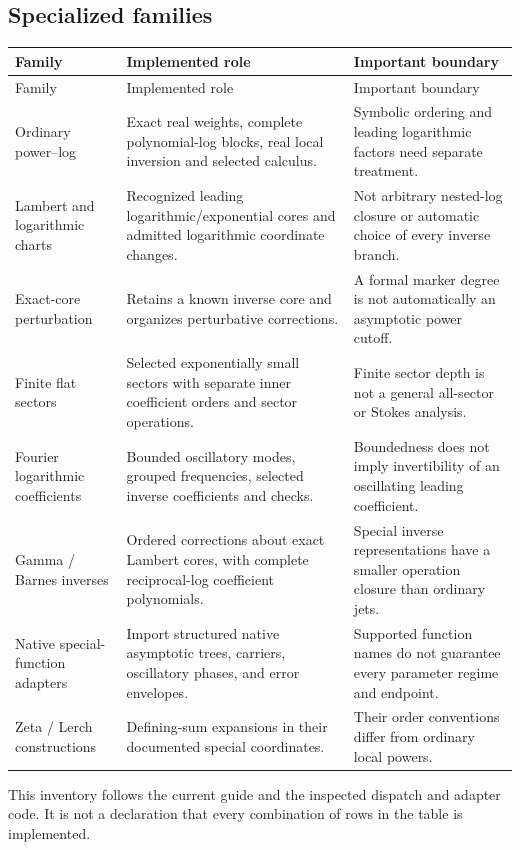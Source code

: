 \documentclass[11pt,a4paper]{article}
\theoremstyle{remark}\newtheorem{remark}[proposition]{Remark}
\begin{document}
\subsection{Specialized families}
\begin{longtable}{P{0.23\textwidth}P{0.42\textwidth}P{0.25\textwidth}}
\toprule Family & Implemented role & Important boundary \\\midrule
\endfirsthead
\toprule Family & Implemented role & Important boundary \\\midrule
\endhead
Ordinary power--log & Exact real weights, complete polynomial-log blocks, real local inversion and selected calculus. & Symbolic ordering and leading logarithmic factors need separate treatment. \\
Lambert and logarithmic charts & Recognized leading logarithmic/exponential cores and admitted logarithmic coordinate changes. & Not arbitrary nested-log closure or automatic choice of every inverse branch. \\
Exact-core perturbation & Retains a known inverse core and organizes perturbative corrections. & A formal marker degree is not automatically an asymptotic power cutoff. \\
Finite flat sectors & Selected exponentially small sectors with separate inner coefficient orders and sector operations. & Finite sector depth is not a general all-sector or Stokes analysis. \\
Fourier logarithmic coefficients & Bounded oscillatory modes, grouped frequencies, selected inverse coefficients and checks. & Boundedness does not imply invertibility of an oscillating leading coefficient. \\
Gamma / Barnes inverses & Ordered corrections about exact Lambert cores, with complete reciprocal-log coefficient polynomials. & Special inverse representations have a smaller operation closure than ordinary jets. \\
Native special-function adapters & Import structured native asymptotic trees, carriers, oscillatory phases, and error envelopes. & Supported function names do not guarantee every parameter regime and endpoint. \\
Zeta / Lerch constructions & Defining-sum expansions in their documented special coordinates. & Their order conventions differ from ordinary local powers. \\
\bottomrule
\end{longtable}
This inventory follows the current guide and the inspected dispatch and adapter code. It is not a declaration that every combination of rows in the table is implemented.\cite{guide,sourcecharts,gamma,native,inverseexpressions}
\end{document}
